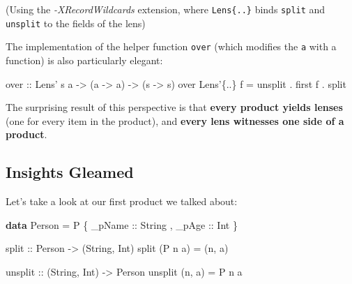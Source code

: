 \documentclass[]{article}
\newenvironment{Shaded}{}{}
\newcommand{\DataTypeTok}[1]{\textcolor[rgb]{0.56,0.13,0.00}{#1}}
\newcommand{\FunctionTok}[1]{\textcolor[rgb]{0.02,0.16,0.49}{#1}}
\newcommand{\KeywordTok}[1]{\textcolor[rgb]{0.00,0.44,0.13}{\textbf{#1}}}
\newcommand{\NormalTok}[1]{#1}
\newcommand{\OtherTok}[1]{\textcolor[rgb]{0.00,0.44,0.13}{#1}}
\begin{document}
(Using the \emph{-XRecordWildcards} extension, where
\texttt{Lens\textquotesingle{}\{..\}} binds \texttt{split} and \texttt{unsplit}
to the fields of the lens)

The implementation of the helper function \texttt{over} (which modifies the
\texttt{a} with a function) is also particularly elegant:

\begin{Shaded}
\begin{Highlighting}[]
\OtherTok{over ::} \DataTypeTok{Lens'}\NormalTok{ s a }\OtherTok{->}\NormalTok{ (a }\OtherTok{->}\NormalTok{ a) }\OtherTok{->}\NormalTok{ (s }\OtherTok{->}\NormalTok{ s)}
\NormalTok{over }\DataTypeTok{Lens'}\NormalTok{\{}\FunctionTok{..}\NormalTok{\} f }\FunctionTok{=}\NormalTok{ unsplit }\FunctionTok{.}\NormalTok{ first f }\FunctionTok{.}\NormalTok{ split}
\end{Highlighting}
\end{Shaded}

The surprising result of this perspective is that \textbf{every product yields
lenses} (one for every item in the product), and \textbf{every lens witnesses
one side of a product}.

\hypertarget{insights-gleamed}{%
\subsection{Insights Gleamed}\label{insights-gleamed}}

Let's take a look at our first product we talked about:

\begin{Shaded}
\begin{Highlighting}[]
\KeywordTok{data} \DataTypeTok{Person} \FunctionTok{=} \DataTypeTok{P}\NormalTok{ \{}\OtherTok{ _pName ::} \DataTypeTok{String}
\NormalTok{                ,}\OtherTok{ _pAge  ::} \DataTypeTok{Int}
\NormalTok{                \}}

\OtherTok{split ::} \DataTypeTok{Person} \OtherTok{->}\NormalTok{ (}\DataTypeTok{String}\NormalTok{, }\DataTypeTok{Int}\NormalTok{)}
\NormalTok{split (}\DataTypeTok{P}\NormalTok{ n a) }\FunctionTok{=}\NormalTok{ (n, a)}

\OtherTok{unsplit ::}\NormalTok{ (}\DataTypeTok{String}\NormalTok{, }\DataTypeTok{Int}\NormalTok{) }\OtherTok{->} \DataTypeTok{Person}
\NormalTok{unsplit (n, a) }\FunctionTok{=} \DataTypeTok{P}\NormalTok{ n a}
\end{Highlighting}
\end{Shaded}
\end{document}
